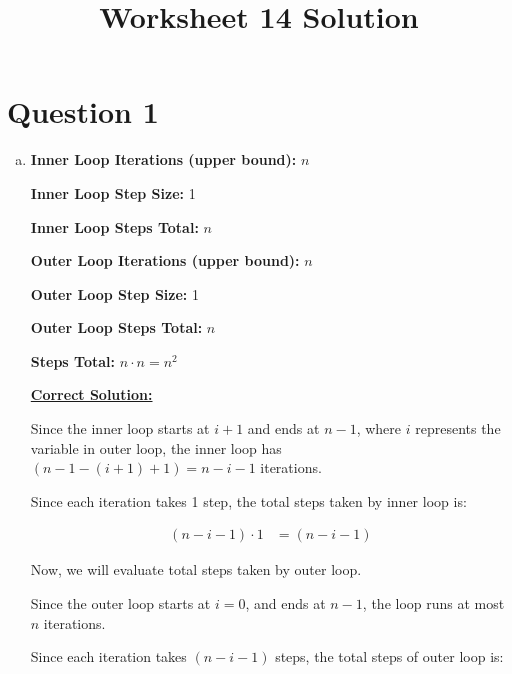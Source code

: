 \documentclass[12pt]{article}
\begin{document}
\title{Worksheet 14 Solution}
\maketitle

\section*{Question 1}
\begin{enumerate}[a.]
    \item

    \textbf{Inner Loop Iterations (upper bound):} $n$

    \textbf{Inner Loop Step Size:} 1

    \textbf{Inner Loop Steps Total:} $n$

    \bigskip

    \textbf{Outer Loop Iterations (upper bound):} $n$

    \textbf{Outer Loop Step Size:} 1

    \textbf{Outer Loop Steps Total:} $n$

    \bigskip

    \textbf{Steps Total:} $n \cdot n = n^2$

    \bigskip

    \begin{tcolorbox}
        \underline{\textbf{Correct Solution:}}

        Since the inner loop starts at $i+1$ and ends at $n-1$, where $i$ represents
        the variable in outer loop, the inner loop has $(n-1 - (i+1) + 1) = n - i - 1$
        iterations.

        \bigskip

        Since each iteration takes 1 step, the total steps taken by inner loop is:

        \begin{align}
            (n - i - 1) \cdot 1 &= (n - i - 1)
        \end{align}

        \bigskip

        Now, we will evaluate total steps taken by outer loop.

        \bigskip

        Since the outer loop starts at $i = 0$, and ends at $n-1$, the loop runs
        at most $n$ iterations.

        \bigskip

        Since each iteration takes $(n -i - 1)$ steps, the total steps of outer
        loop is:


\end{tcolorbox}
\end{enumerate}
\end{document}
